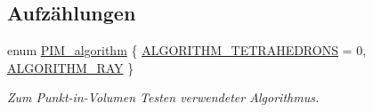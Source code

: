 \subsection*{Aufzählungen}
\begin{DoxyCompactItemize}
\item 
enum \hyperlink{namespaceUtils_ad369b0127cabda0d6871ce1ae7e6c862}{P\-I\-M\-\_\-algorithm} \{ \hyperlink{namespaceUtils_ad369b0127cabda0d6871ce1ae7e6c862a68e0a4da7ea369e1ba873c380926f010}{A\-L\-G\-O\-R\-I\-T\-H\-M\-\_\-\-T\-E\-T\-R\-A\-H\-E\-D\-R\-O\-N\-S} = 0, 
\hyperlink{namespaceUtils_ad369b0127cabda0d6871ce1ae7e6c862a4606bd560af1a6fd19e854e13613e9d0}{A\-L\-G\-O\-R\-I\-T\-H\-M\-\_\-\-R\-A\-Y}
 \}
\begin{DoxyCompactList}\small\item\em Zum Punkt-\/in-\/\-Volumen Testen verwendeter Algorithmus. \end{DoxyCompactList}\end{DoxyCompactItemize}
